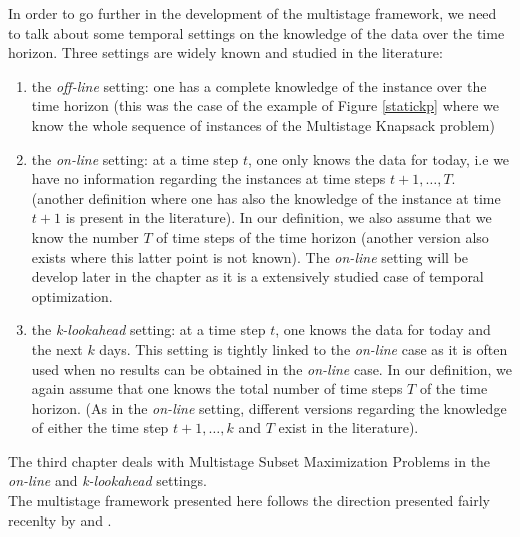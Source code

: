 \documentclass[a4paper]{book}
\begin{document}
In order to go further in the development of the multistage framework, we need to talk about some temporal settings on the knowledge of the data over the time horizon. Three settings are widely known and studied in the literature:
\begin{enumerate}
    \item the \emph{off-line} setting: one has a complete knowledge of the instance over the time horizon (this was the case of the example of Figure \ref{statickp} where we know the whole sequence of instances of the {\sc Multistage Knapsack} problem)
    \item the \emph{on-line} setting: at a time step $t$, one only knows the data for today, i.e we have no information regarding the instances at time steps $t+1,\ldots,T$. (another definition where one has also the knowledge of the instance at time $t+1$ is present in the literature). In our definition, we also assume that we know the number $T$ of time steps of the time horizon (another version also exists where this latter point is not known). The \emph{on-line} setting will be develop later in the chapter as it is a extensively studied case of temporal optimization.
    \item the \emph{k-lookahead} setting: at a time step $t$, one knows the data for today and the next $k$ days. This setting is tightly linked to the \emph{on-line} case as it is often used when no results can be obtained in the \emph{on-line} case. In our definition, we again assume that one knows the total number of time steps $T$ of the time horizon. (As in the \emph{on-line} setting, different versions regarding the knowledge of either the time step $t+1,\ldots,k$ and $T$ exist in the literature).
\end{enumerate}

The third chapter deals with Multistage Subset Maximization Problems in the \emph{on-line} and \emph{k-lookahead} settings. \\

The multistage framework presented here follows the direction presented fairly recenlty by \cite{Gupta} and \cite{Eisenstat}.\\
\end{document}
